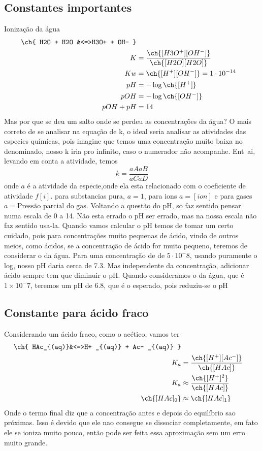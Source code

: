 \subsection{Constantes importantes}
 Ionização da água
 \begin{align}
     \ch{
     H2O + H2O &<=>H3O+ + OH- 
     }\\
     K&=\frac{\ch{[H3O^+][OH^-]}}{\ch{[H2O][H2O]}}\\
     Kw&=\ch{[H^+][OH^-]}=1 \cdot 10^{-14}\\
     pH&=-\log \ch{[H^+]}\\
     pOH&= -\log \ch{[OH^- ]}\\
     pOH+pH&=14  
\end{align}
Mas por que se deu um salto onde se perdeu as concentrações da água? O mais correto de se analisar na
equação de k, o ideal seria analisar as atividades das especies químicas, pois imagine que temos uma
concentração muito baixa no denominado, nosso k iria pro infinito, caso o numerador não acompanhe.
Ent~ai, levando em conta a atividade, temos
\begin{equation}
    k=\frac{aA aB}{aC aD}
\end{equation}
onde \(a\) é a atividade da especie,onde ela esta relacionado com o coeficiente de atividade
\(f[i]\). para substancias pura, \(a=1\), para ions \(a=[ion]\) e para gases \(a=\text{Pressão
parcial do gas}\). Voltando a questão do pH, so faz sentido pensar numa escala de 0 a 14. Não esta
errado o pH ser errado, mas na nossa escala não faz sentido usa-la. Quando vamos calcular o pH temos
de tomar um certo cuidado, pois para concentrações muito pequenas de ácido, vindo de outros meios,
como ácidos, se a concentração de ácido for muito pequeno, teremos de considerar o \ch{[H^+]} da
água. Para uma concentração de  de \(5 \cdot 10^-8\), usando puramente o log, nosso pH daria
cerca de 7.3. Mas independente da concentração, adicionar ácido sempre tem que diminuir o pH.
Quando consideramos o \ch{[H^+]} da água, que é\(1 \times 10^-7\), teremos um pH de 6.8, que é o esperado,
pois reduziu-se o pH
\subsection{Constante para ácido fraco}
Considerando um ácido fraco, como o acético, vamos ter
\begin{align}
    \ch{
    HAc_{(aq)}&<=>H+ _{(aq)} + Ac- _{(aq)}
    }\\
    K_a&=\frac{\ch{[H^+][Ac^-]}}{\ch{[HAc]}}\\
    K_a &\approx \frac{\ch{[H^+]^2}}{\ch{[HAc]}}\\
    \ch{[HAc]_0} &\approx \ch{[HAc]_1}
\end{align}
Onde o termo final diz que a concentração antes e depois do equilíbrio sao próximas. Isso é devido
que ele nao consegue se dissociar completamente, em fato ele se ioniza muito pouco, então pode ser
feita essa aproximação sem um erro muito grande.

